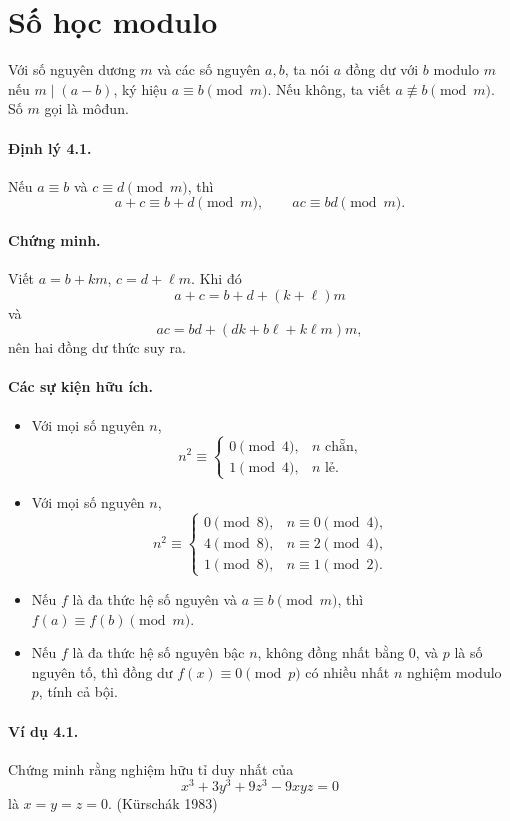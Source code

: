 \documentclass[11pt]{article}
\begin{document}
\section{Số học modulo}

Với số nguyên dương \(m\) và các số nguyên \(a,b\), ta nói \(a\) đồng dư với
\(b\) modulo \(m\) nếu \(m\mid(a-b)\), ký hiệu \(a\equiv b\pmod m\). Nếu
không, ta viết \(a\not\equiv b\pmod m\). Số \(m\) gọi là môđun.

\paragraph{Định lý 4.1.}
Nếu \(a\equiv b\) và \(c\equiv d\pmod m\), thì
\[
 a+c\equiv b+d\pmod m,\qquad ac\equiv bd\pmod m.
\]

\paragraph{Chứng minh.}
Viết \(a=b+km\), \(c=d+\ell m\). Khi đó
\[
 a+c=b+d+(k+\ell)m
\]
và
\[
 ac=bd+(dk+b\ell+k\ell m)m,
\]
nên hai đồng dư thức suy ra.

\paragraph{Các sự kiện hữu ích.}
\begin{itemize}
\item Với mọi số nguyên \(n\),
\[
 n^2\equiv
 \begin{cases}
 0\pmod4,& n\text{ chẵn},\\
 1\pmod4,& n\text{ lẻ}.
 \end{cases}
\]
\item Với mọi số nguyên \(n\),
\[
 n^2\equiv
 \begin{cases}
 0\pmod8,& n\equiv0\pmod4,\\
 4\pmod8,& n\equiv2\pmod4,\\
 1\pmod8,& n\equiv1\pmod2.
 \end{cases}
\]
\item Nếu \(f\) là đa thức hệ số nguyên và \(a\equiv b\pmod m\), thì
\(f(a)\equiv f(b)\pmod m\).
\item Nếu \(f\) là đa thức hệ số nguyên bậc \(n\), không đồng nhất bằng \(0\),
và \(p\) là số nguyên tố, thì đồng dư \(f(x)\equiv0\pmod p\) có nhiều nhất
\(n\) nghiệm modulo \(p\), tính cả bội.
\end{itemize}

\paragraph{Ví dụ 4.1.}
Chứng minh rằng nghiệm hữu tỉ duy nhất của
\[
 x^3+3y^3+9z^3-9xyz=0
\]
là \(x=y=z=0\). (Kürschák 1983)
\end{document}
